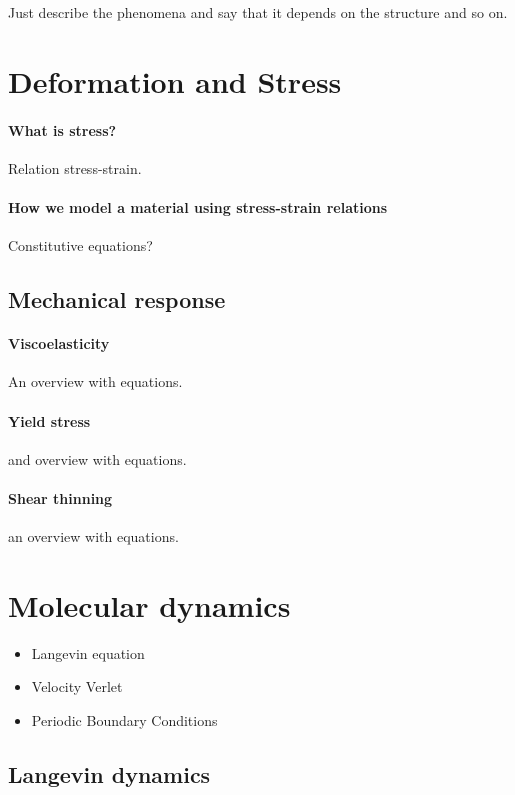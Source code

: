Just describe the phenomena and say that it depends on the structure and so on.


\section{Deformation and Stress}

\paragraph{What is stress?} Relation stress-strain.

\paragraph{How we model a material using stress-strain relations} Constitutive equations?

\subsection{Mechanical response}\label{ch2:MechResponse}

\paragraph{Viscoelasticity} An overview with equations.

\paragraph{Yield stress} and overview with equations.

\paragraph{Shear thinning} an overview with equations.


\section{Molecular dynamics}\label{ch2:MD}

\begin{itemize}
    \item Langevin equation
    \item Velocity Verlet
    \item Periodic Boundary Conditions
\end{itemize}

\subsection{Langevin dynamics}

